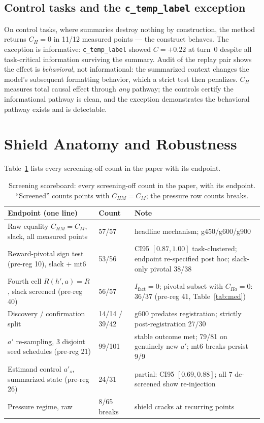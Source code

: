 \documentclass{article}
\theoremstyle{remark}
\begin{document}
\subsection{Control tasks and the \texttt{c\_temp\_label} exception}
On control tasks, where summaries destroy nothing by construction, the
method returns $C_H = 0$ in 11/12 measured points --- the construct behaves.
The exception is informative: \texttt{c\_temp\_label} showed $C = +0.22$ at
turn~0 despite all task-critical information surviving the summary. Audit of
the replay pair shows the effect is \emph{behavioral}, not informational: the
summarized context changes the model's subsequent formatting behavior, which
a strict test then penalizes. $C_H$ measures total causal effect through
\emph{any} pathway; the controls certify the informational pathway is clean,
and the exception demonstrates the behavioral pathway exists and is
detectable.

\section{Shield Anatomy and Robustness}
\label{app:shield}
Table~\ref{tab:scoreboard} lists every screening-off count in the paper
with its endpoint.
\begin{table}[h]
\centering\scriptsize
\begin{tabular}{@{}p{5.4cm}lp{5.6cm}@{}}
\toprule
Endpoint (one line) & Count & Note \\
\midrule
Raw equality $C_{HM}=C_M$, slack, all measured points & 57/57 & headline
mechanism; g450/g600/g900 \\
Reward-pivotal sign test (pre-reg 10), slack + mt6 & 53/56 & CI95 $[0.87,1.00]$
task-clustered; endpoint re-specified post hoc; slack-only pivotal 38/38 \\
Fourth cell $R(h',a) = R$, slack screened (pre-reg 40) & 56/57 &
$I_{\text{fact}} = 0$; pivotal subset with $C_{Ha} = 0$: 36/37 (pre-reg
41, Table~\ref{tab:med}) \\
Discovery / confirmation split & 14/14 / 39/42 & g600 predates
registration; strictly post-registration 27/30 \\
$a'$ re-sampling, 3 disjoint seed schedules (pre-reg 21) & 99/101 &
stable outcome met; 79/81 on genuinely new $a'$; mt6 breaks persist 9/9 \\
Estimand control $a'_s$, summarized state (pre-reg 26) & 24/31 &
partial: CI95 $[0.69,0.88]$; all 7 de-screened show re-injection \\
Pressure regime, raw & 8/65 breaks & shield cracks at recurring points \\
\bottomrule
\end{tabular}
\caption{Screening scoreboard: every screening-off count in the paper,
with its endpoint. ``Screened'' counts points with $C_{HM}=C_M$; the
pressure row counts breaks.}
\label{tab:scoreboard}
\end{table}
\end{document}
